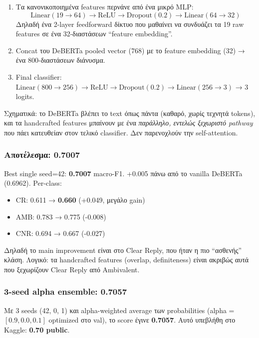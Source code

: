 \documentclass[12pt]{fphw}
\begin{document}
\begin{enumerate}
    \item Τα κανονικοποιημένα features περνάνε από ένα μικρό MLP:
    \[
    \text{Linear}(19 \to 64) \to \text{ReLU} \to \text{Dropout}(0.2) \to \text{Linear}(64 \to 32)
    \]
    Δηλαδή ένα 2-layer feedforward δίκτυο που μαθαίνει να συνδυάζει τα 19 raw features σε ένα 32-διαστάσεων ``feature embedding''.

    \item Concat του DeBERTa pooled vector (768) με το feature embedding (32) → ένα 800-διαστάσεων διάνυσμα.

    \item Final classifier: \(\text{Linear}(800 \to 256) \to \text{ReLU} \to \text{Dropout}(0.2) \to \text{Linear}(256 \to 3)\) → 3 logits.
\end{enumerate}

Σχηματικά: το DeBERTa βλέπει το text όπως πάντα (καθαρό, χωρίς τεχνητά tokens), και τα handcrafted features μπαίνουν με ένα \emph{παράλληλο, εντελώς ξεχωριστό pathway} που πάει κατευθείαν στον τελικό classifier. Δεν παρενοχλούν την self-attention.

\subsubsection{Αποτέλεσμα: 0.7007}

Best single seed=42: \textbf{0.7007} macro-F1. +0.005 πάνω από το vanilla DeBERTa (0.6962). Per-class:
\begin{itemize}
    \item CR: 0.611 → \textbf{0.660} (+0.049, μεγάλο gain)
    \item AMB: 0.783 → 0.775 (-0.008)
    \item CNR: 0.694 → 0.667 (-0.027)
\end{itemize}

Δηλαδή το main improvement είναι στο Clear Reply, που ήταν η πιο ``ασθενής'' κλάση. Λογικό: τα handcrafted features (overlap, definiteness) είναι ακριβώς αυτά που ξεχωρίζουν Clear Reply από Ambivalent.

\subsubsection{3-seed alpha ensemble: 0.7057}

Με 3 seeds (42, 0, 1) και alpha-weighted average των probabilities (alpha = $[0.9, 0.0, 0.1]$ optimized στο val), το score έγινε \textbf{0.7057}. Αυτό υπεβλήθη στο Kaggle: \textbf{0.70 public}.
\end{document}

